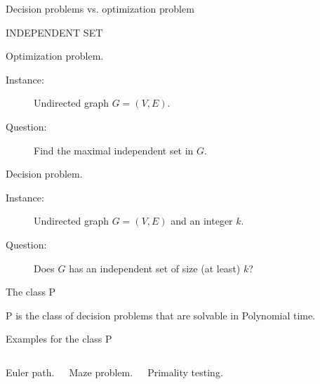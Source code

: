 \begin{frame}{Decision problems vs. optimization problem}
  \begin{exampleblock}{INDEPENDENT SET}
    \begin{block}{Optimization problem.}
      \begin{description}
	\item[Instance:] Undirected graph $G = (V, E)$.
	\item[Question:] Find the maximal independent set in $G$.
      \end{description}
    \end{block}

    \vspace{-0.30cm}
    \vspace{-0.50cm}

    \begin{block}{Decision problem.}
      \begin{description}
	\item[Instance:] Undirected graph $G = (V, E)$ and an integer $k$.
	\item[Question:] Does $G$ has an independent set of size (at least) $k$?
      \end{description}
    \end{block}
  \end{exampleblock}
\end{frame}
\begin{frame}{The class P}
  \begin{definition}
    P is the class of decision problems that are solvable in Polynomial time.
  \end{definition}

  \begin{exampleblock}{Examples for the class P}
    \begin{columns}[t]
	\begin{center}
	  Euler path.
	\end{center}
	\begin{center}
	  Maze problem.
	\end{center}
	\begin{center}
	  Primality testing.
	\end{center}
    \end{columns}
  \end{exampleblock}
\end{frame}

